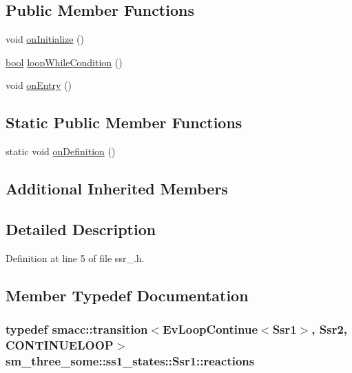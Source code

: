 \subsection*{Public Member Functions}
\begin{DoxyCompactItemize}
\item 
void \hyperlink{structsm__three__some_1_1ss1__states_1_1Ssr1_a8cdf7026b15fef41962e7726ad5d3c8b}{on\+Initialize} ()
\item 
\hyperlink{classbool}{bool} \hyperlink{structsm__three__some_1_1ss1__states_1_1Ssr1_a3bb61da3b273931fb05461242f0c9aed}{loop\+While\+Condition} ()
\item 
void \hyperlink{structsm__three__some_1_1ss1__states_1_1Ssr1_a5e8b5d1cbd96f419052a58d069f4737e}{on\+Entry} ()
\end{DoxyCompactItemize}
\subsection*{Static Public Member Functions}
\begin{DoxyCompactItemize}
\item 
static void \hyperlink{structsm__three__some_1_1ss1__states_1_1Ssr1_acdb4a482de2222ab4f68072faaaa43e8}{on\+Definition} ()
\end{DoxyCompactItemize}
\subsection*{Additional Inherited Members}


\subsection{Detailed Description}


Definition at line 5 of file ssr\+\_.\+h.



\subsection{Member Typedef Documentation}
\subsubsection[{\texorpdfstring{reactions}{reactions}}]{\setlength{\rightskip}{0pt plus 5cm}typedef {\bf smacc\+::transition}$<$Ev\+Loop\+Continue$<${\bf Ssr1}$>$, {\bf Ssr2}, C\+O\+N\+T\+I\+N\+U\+E\+L\+O\+OP$>$ {\bf sm\+\_\+three\+\_\+some\+::ss1\+\_\+states\+::\+Ssr1\+::reactions}}\hypertarget{structsm__three__some_1_1ss1__states_1_1Ssr1_a6f1fb945fa67b4db830cff041397fe56}{}\label{structsm__three__some_1_1ss1__states_1_1Ssr1_a6f1fb945fa67b4db830cff041397fe56}


